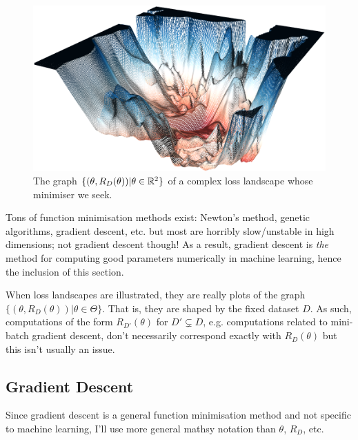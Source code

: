 \documentclass[11pt]{article}
\begin{document}
\begin{figure}[t]
    \centering
    \begin{minipage}{0.67\linewidth}
        \includegraphics[width=\linewidth]{./figures/gradient_descent/loss_landscape.png}
    \end{minipage}%
    \hfill
    \begin{minipage}{0.3\linewidth}
        \caption{The graph $\{(\theta,R_D(\theta))|\theta\in\mathbb{R}^2\}$ of a complex loss landscape whose minimiser we seek.}
        \label{fig:loss_landscape_complex}
    \end{minipage}
\end{figure}

Tons of function minimisation methods exist: Newton's method, genetic algorithms, gradient descent, etc. but most are horribly slow/unstable in high dimensions; not gradient descent though! As a result, gradient descent is \textit{the} method for computing good parameters numerically in machine learning, hence the inclusion of this section.

\begin{tcolorbox}[title={\centering\textbf{Illustrations of loss landscapes are dataset-dependent!}}, colback=myLightBlue, colbacktitle=myDarkBlue, colframe=myDarkBlue, coltitle=white]
    When loss landscapes are illustrated, they are really plots of the graph $\{(\theta, R_D(\theta))|\theta\in\Theta\}$. That is, they are shaped by the fixed dataset $D$. As such, computations of the form $R_{D'}(\theta)$ for $D'\subsetneq D$, e.g. computations related to mini-batch gradient descent, don't necessarily correspond exactly with $R_D(\theta)$ but this isn't usually an issue.
\end{tcolorbox}

\subsection{Gradient Descent}
Since gradient descent is a general function minimisation method and not specific to machine learning, I'll use more general mathsy notation than $\theta$, $R_D$, etc.
\end{document}
